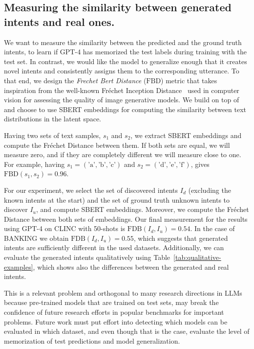 \documentclass[11pt]{article}
\begin{document}
\subsection{Measuring the similarity between generated intents and real ones.} We want to measure the similarity between the predicted and the ground truth intents, to learn if GPT-4 has memorized the test labels during training with the test set. In contrast, we would like the model to generalize enough that it creates novel intents and consistently assigns them to the corresponding utterance. To that end, we design the \textit{Frechet Bert Distance} ($\text{FBD}$) metric that takes inspiration from the well-known Fréchet Inception Distance~\cite{heusel2017gans} used in computer vision for assessing the quality of image generative models. We build on top of \citet{semeniuta2018accurate} and choose to use SBERT embeddings for computing the similarity between text distributions in the latent space. 

Having two sets of text samples, $s_1$ and $s_2$, we extract SBERT embeddings and compute the Fréchet Distance between them. If both sets are equal, we will measure zero, and if they are completely different we will measure close to one. For example, having $s_1=(\text{'a'}, \text{'b'}, \text{'c'})$ and $s_2=(\text{'d'}, \text{'e'}, \text{'f'})$,  gives $\text{FBD}(s_1, s_2) = 0.96$. 

For our experiment, we select the set of discovered intents $I_d$ (excluding the known intents at the start) and the set of ground truth unknown intents to discover $I_u$, and compute SBERT embeddings. Moreover, we compute the Fréchet Distance between both sets of embeddings. Our final measurement for the results using GPT-4 on CLINC with 50-shots is $\text{FDB}(I_d, I_u) = 0.54$. In the case of BANKING we obtain $\text{FDB}(I_d, I_u) = 0.55$, which suggests that generated intents are sufficiently different in the used datasets. Additionally, we can evaluate the generated intents qualitatively using Table~\ref{tab:qualitative-examples}, which shows also the differences between the generated and real intents.

This is a relevant problem and orthogonal to many research directions in LLMs because pre-trained models that are trained on test sets, may break the confidence of future research efforts in popular benchmarks for important problems. Future work must put effort into detecting which models can be evaluated in which dataset, and even though that is the case, evaluate the level of memorization of test predictions and model generalization.
\end{document}

